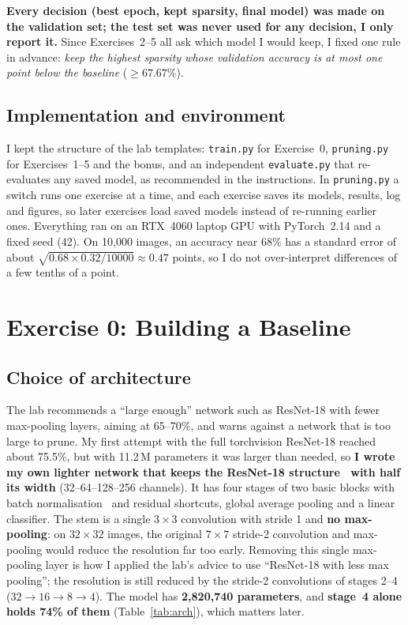 \documentclass[11pt,a4paper]{article}
\newcommand{\code}[1]{\texttt{#1}}
\begin{document}
\textbf{Every decision (best epoch, kept sparsity, final model) was made on the validation set; the test set was never used for any decision, I only report it.} Since Exercises~2--5 all ask which model I would keep, I fixed one rule in advance: \emph{keep the highest sparsity whose validation accuracy is at most one point below the baseline} ($\ge 67.67\%$).

\subsection{Implementation and environment}
I kept the structure of the lab templates: \code{train.py} for Exercise~0, \code{pruning.py} for Exercises~1--5 and the bonus, and an independent \code{evaluate.py} that re-evaluates any saved model, as recommended in the instructions. In \code{pruning.py} a switch runs one exercise at a time, and each exercise saves its models, results, log and figures, so later exercises load saved models instead of re-running earlier ones. Everything ran on an RTX~4060 laptop GPU with PyTorch~2.14 and a fixed seed (42). On 10{,}000 images, an accuracy near 68\% has a standard error of about $\sqrt{0.68 \times 0.32/10000} \approx 0.47$ points, so I do not over-interpret differences of a few tenths of a point.

\section{Exercise 0: Building a Baseline}

\subsection{Choice of architecture}
The lab recommends a ``large enough'' network such as ResNet-18 with fewer max-pooling layers, aiming at 65--70\%, and warns against a network that is too large to prune. My first attempt with the full torchvision ResNet-18 reached about 75.5\%, but with 11.2\,M parameters it was larger than needed, so \textbf{I wrote my own lighter network that keeps the ResNet-18 structure~\cite{he2016deep} with half its width} (32--64--128--256 channels). It has four stages of two basic blocks with batch normalisation~\cite{ioffe2015batch} and residual shortcuts, global average pooling and a linear classifier. The stem is a single $3\times3$ convolution with stride 1 and \textbf{no max-pooling}: on $32\times32$ images, the original $7\times7$ stride-2 convolution and max-pooling would reduce the resolution far too early. Removing this single max-pooling layer is how I applied the lab's advice to use ``ResNet-18 with less max pooling''; the resolution is still reduced by the stride-2 convolutions of stages 2--4 ($32 \rightarrow 16 \rightarrow 8 \rightarrow 4$). The model has \textbf{2{,}820{,}740 parameters}, and \textbf{stage~4 alone holds 74\% of them} (Table~\ref{tab:arch}), which matters later.
\end{document}
